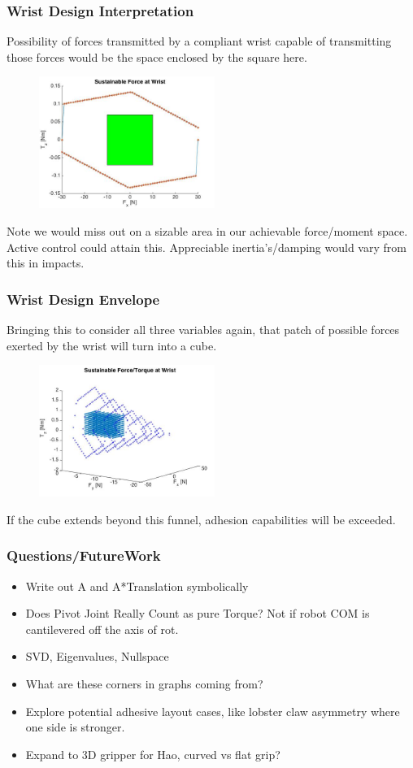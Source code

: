 \documentclass{beamer}
\begin{document}
\frame
{
\frametitle{ Wrist Design Interpretation }

Possibility of forces transmitted by a compliant wrist capable of transmitting those forces would be the space enclosed by the square here. 

\begin{figure}[htb]
	\centering
	\includegraphics[width=2.25in]{images/WristCompliance2D.jpg}
	\caption{}
\end{figure}

Note we would miss out on a sizable area in our achievable force/moment space. Active control could attain this. Appreciable inertia's/damping would vary from this in impacts. 

}


\frame
{
\frametitle{ Wrist Design Envelope}

Bringing this to consider all three variables again, that patch of possible forces exerted by the wrist will turn into a cube. 

\begin{figure}[htb]
	\centering
	\includegraphics[width=2.25in]{images/WristConstraints.jpg}
	\caption{}
\end{figure}

If the cube extends beyond this funnel, adhesion capabilities will be exceeded. 

}

\frame
{
\frametitle{ Questions/FutureWork }

\begin{itemize}

	\item Write out A and A*Translation symbolically
	\item Does Pivot Joint Really Count as pure Torque? Not if robot COM is cantilevered off the axis of rot. 
	\item SVD, Eigenvalues, Nullspace
	\item What are these corners in graphs coming from? 
	\item Explore potential adhesive layout cases, like lobster claw asymmetry where one side is stronger. 
	\item Expand to 3D gripper for Hao, curved vs flat grip? 
\end{itemize}

}
\end{document}
